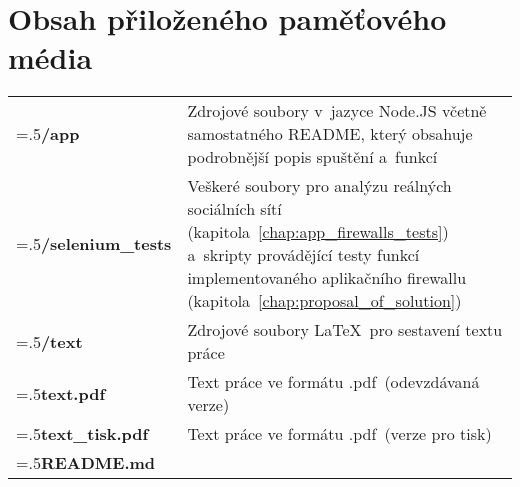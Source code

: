 \chapter{Obsah přiloženého paměťového média}

\setlength{\extrarowheight}{15pt}

\begin{table}[H]
\begin{tabularx}{\linewidth}{
  >{\raggedright\arraybackslash\hsize=.5\hsize}X >{\hsize=1.5\hsize}X
  }

\textbf{/app} & Zdrojové soubory v~jazyce Node.JS včetně samostatného README, který obsahuje podrobnější popis spuštění a~funkcí \\

\textbf{/selenium\_tests} & Veškeré soubory pro analýzu reálných sociálních sítí (kapitola~\ref{chap:app_firewalls_tests}) a~skripty provádějící testy funkcí implementovaného aplikačního firewallu (kapitola~\ref{chap:proposal_of_solution}) \\
\textbf{/text} & Zdrojové soubory \LaTeX~pro sestavení textu práce \\
\textbf{text.pdf} & Text práce ve formátu .pdf~(odevzdávaná verze) \\
\textbf{text\_tisk.pdf} & Text práce ve formátu .pdf~(verze pro tisk) \\
\textbf{README.md} & \\

\end{tabularx}
\end{table}